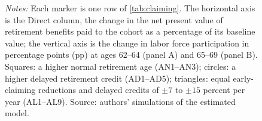 \begin{figure}[!t]
\vspace{2pt}

\begin{minipage}{0.92\textwidth}
\vspace{4pt}
\scriptsize
\textit{Notes:} Each marker is one row of \autoref{tab:claiming}. The horizontal axis is the Direct column, the change in the net present value of retirement benefits paid to the cohort as a percentage of its baseline value; the vertical axis is the change in labor force participation in percentage points (pp) at ages 62--64 (panel A) and 65--69 (panel B). Squares: a higher normal retirement age (AN1--AN3); circles: a higher delayed retirement credit (AD1--AD5); triangles: equal early-claiming reductions and delayed credits of $\pm7$ to $\pm15$ percent per year (AL1--AL9). Source: authors' simulations of the estimated model.
\end{minipage}
\end{figure}
